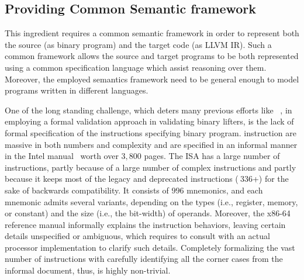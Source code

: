 \subsection{Providing Common Semantic framework} This ingredient requires a
common semantic framework in order to represent both the source (as \ISA binary
    program) and the target code (as LLVM IR). Such a common framework allows
the source and target programs to be both represented using a common
specification language which assist reasoning over them. Moreover, the employed
semantics framework need to be general enough to model programs written in
different languages.

One of the long standing challenge, which deters many previous efforts like
~\cite{ASE2017}, in employing a formal validation approach in validating binary
lifters, is the lack of formal specification of the \ISA instructions
specifying binary program. \ISA instruction are massive in both numbers and
complexity and are specified in an informal manner in the Intel
manual~\cite{IntelManual} worth over $3,800$ pages. The \ISA ISA has a large
number of instructions, partly because of a large number of complex
  instructions and partly because it keeps most of the legacy and deprecated
  instructions ($~336$+) for the sake of backwards compatibility. It consists
  of $996$ mnemonics, and each mnemonic admits several variants, depending on
  the types (i.e., register, memory, or constant) and the size (i.e., the
      bit-width) of operands. Moreover, the x86-64 reference manual informally
  explains the instruction behaviors, leaving certain details unspecified or
  ambiguous, which requires  to consult with an actual processor implementation
  to clarify such details. Completely formalizing the vast number of
  instructions with carefully identifying all the corner cases from the
  informal document, thus, is highly non-trivial.

